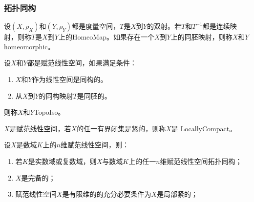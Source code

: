 \subsubsection{拓扑同构}
\begin{definition}
	设$(X,\rho_X)$和$(Y,\rho_Y)$都是度量空间，$T$是$X$到$Y$的双射。若$T$和$T^{-1}$都是连续映射，则称$T$是$X$到$Y$上的\gls{HomeoMap}。如果存在一个$X$到$Y$上的同胚映射，则称$X$和$Y$\gls{homeomorphic}。
\end{definition}
\begin{definition}
	设$X$和$Y$都是赋范线性空间，如果满足条件：
	\begin{enumerate}
		\item $X$和$Y$作为线性空间是同构的。
		\item 从$X$到$Y$的同构映射$T$是同胚的。
	\end{enumerate}
	则称$X$和$Y$\gls{TopoIso}。
\end{definition}
\begin{definition}
	$X$是赋范线性空间，若$X$的任一有界闭集是紧的，则称$X$是
	\gls{LocallyCompact}。
\end{definition}
\begin{property}\label{prop:FiniteDimensionalNormedLinearSpace}
	设$X$是数域$K$上的$n$维赋范线性空间，则：
	\begin{enumerate}
		\item 若$K$是实数域或复数域，则$X$与数域$K$上的任一$n$维赋范线性空间拓扑同构；
		\item $X$是完备的；
		\item 赋范线性空间$X$是有限维的的充分必要条件为$X$是局部紧的；
	\end{enumerate}
\end{property}
